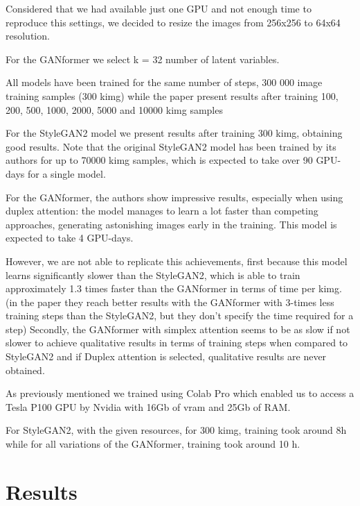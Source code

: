 \documentclass{article}
\begin{document}
	Considered that we had available just one GPU and not enough time to reproduce this settings, we 
	decided to resize the images from 256x256 to 64x64 resolution.
	
	
	For the GANformer we select k = 32 number of latent variables. 
	
	All models have been trained for the same number of steps, 300 000 image
	training samples (300 kimg) while the paper present results after training 100, 200, 500, 1000, 2000, 
	5000 and 10000 kimg samples
	
	For the StyleGAN2 model we present results after training 300 kimg, obtaining 
	good results.
	Note that the original StyleGAN2 model has been trained by its authors \cite{karras2020analyzing} 
	for up to 70000 kimg samples, which is expected to take over 90 GPU-days for a single model. 
	
	
	For the GANformer, the authors \cite{karras2020analyzing} show impressive results, especially when 
	using duplex attention: the model manages to learn a lot faster than competing approaches, 
	generating astonishing images early in the training. This model is expected to take 4 GPU-days.
	
	However, we are not able to replicate this achievements, first because this model learns significantly 
	slower than the StyleGAN2, which is able to train approximately 
	1.3 times faster than the GANformer in terms of time per kimg.
	(in the paper they reach better results with the GANformer with 3-times less training steps than the 
	StyleGAN2, but they don't specify the time required for a step)
	Secondly, the GANformer with simplex attention seems to be as slow if not slower to achieve 
	qualitative results
	in terms of training steps when compared to StyleGAN2 and if Duplex attention is selected, 
	qualitative results are never obtained.
	
	As previously mentioned we trained using Colab Pro which enabled us to access a Tesla P100 GPU 
	by Nvidia with 16Gb of vram 
	and 25Gb of RAM.
	
	For StyleGAN2, with the given resources, for 300 kimg, training took around 8h while for all 
	variations of the GANformer, training took around 10 h.
	
	
	\section{Results}\label{sec:results}
	
\end{document}
